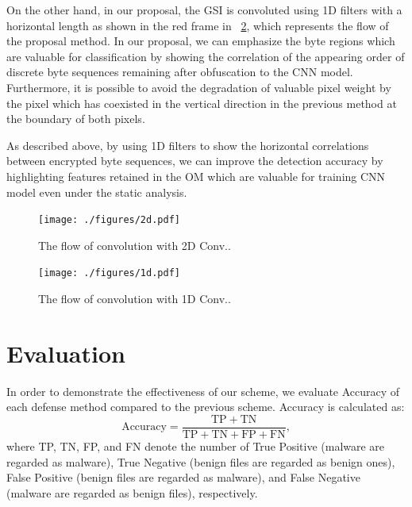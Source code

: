 \documentclass{ieeeaccess}
\begin{document}
On the other hand, in our proposal, the GSI is convoluted using 1D filters with a horizontal length as shown in the red frame in \figurename~\ref{fig:1d}, which represents the flow of the proposal method.
In our proposal, we can emphasize the byte regions which are valuable for classification by showing the correlation of the appearing order of discrete byte sequences remaining after obfuscation to the CNN model.
Furthermore, it is possible to avoid the degradation of valuable pixel weight by the pixel which has coexisted in the vertical direction in the previous method at the boundary of both pixels.

As described above, by using 1D filters to show the horizontal correlations between encrypted byte sequences, we can improve the detection accuracy by highlighting features retained in the OM which are valuable for training CNN model even under the static analysis.

\begin{figure}[h]
 \centering
 \texttt{[image: ./figures/2d.pdf]}
 \caption{The flow of convolution with 2D Conv..} 
 \label{fig:2d}
\end{figure}
\begin{figure}[h]
 \centering
 \texttt{[image: ./figures/1d.pdf]}
 \caption{The flow of convolution with 1D Conv..} 
 \label{fig:1d}
\end{figure}

\section{Evaluation} \label{sec:evaluation}
In order to demonstrate the effectiveness of our scheme, we evaluate Accuracy of each defense method compared to the previous scheme.
Accuracy is calculated as:
\begin{equation}
  \mathrm{Accuracy} = \frac{\mathrm{TP}+\mathrm{TN}}{\mathrm{TP} + \mathrm{TN} + \mathrm{FP} + \mathrm{FN}}, 
\end{equation}
where TP, TN, FP, and FN denote the number of True Positive (malware are regarded as malware), True Negative (benign files are regarded as benign ones), False Positive (benign files are regarded as malware), and False Negative (malware are regarded as benign files), respectively.  
\end{document}
